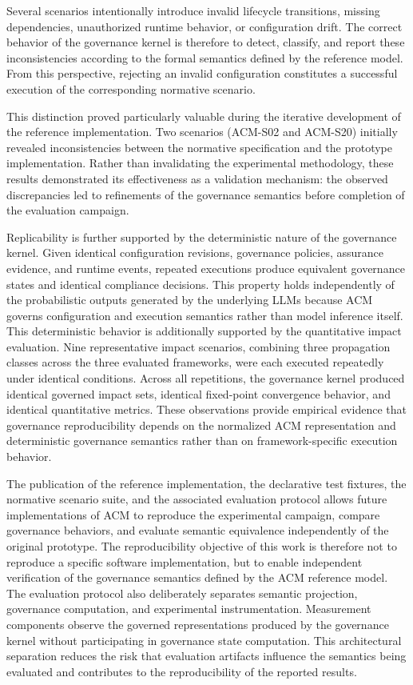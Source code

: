 \documentclass[10pt]{article}
\begin{document}
Several scenarios intentionally introduce invalid lifecycle transitions, missing dependencies, unauthorized runtime behavior, or configuration drift. The correct behavior of the governance kernel is therefore to detect, classify, and report these inconsistencies according to the formal semantics defined by the reference model. From this perspective, rejecting an invalid configuration constitutes a successful execution of the corresponding normative scenario.

This distinction proved particularly valuable during the iterative development of the reference implementation. Two scenarios (ACM-S02 and ACM-S20) initially revealed inconsistencies between the normative specification and the prototype implementation. Rather than invalidating the experimental methodology, these results demonstrated its effectiveness as a validation mechanism: the observed discrepancies led to refinements of the governance semantics before completion of the evaluation campaign.

Replicability is further supported by the deterministic nature of the
governance kernel. Given identical configuration revisions, governance
policies, assurance evidence, and runtime events, repeated executions produce equivalent governance states and identical compliance decisions. This property holds independently of the probabilistic outputs generated by the underlying LLMs because ACM governs configuration and execution semantics rather than
model inference itself. This deterministic behavior is additionally supported by the quantitative impact evaluation. Nine representative impact scenarios, combining three propagation classes across the three evaluated frameworks, were each executed repeatedly under identical conditions. Across all repetitions, the governance kernel produced identical governed impact sets, identical fixed-point convergence behavior, and identical quantitative metrics. These observations provide empirical evidence that governance reproducibility depends on the normalized ACM representation and deterministic governance semantics rather than on framework-specific execution behavior.

The publication of the reference implementation, the declarative test
fixtures, the normative scenario suite, and the associated evaluation protocol allows future implementations of ACM to reproduce the experimental campaign, compare governance behaviors, and evaluate semantic equivalence independently of the original prototype. The reproducibility objective of this work is therefore not to reproduce a specific software implementation, but to enable independent verification of the governance semantics defined by the ACM reference model.
The evaluation protocol also deliberately separates semantic projection, governance computation, and experimental instrumentation. Measurement components observe the governed representations produced by the governance kernel without participating in governance state computation. This architectural separation reduces the risk that evaluation artifacts influence the semantics being evaluated and contributes to the reproducibility of the reported results.
\end{document}
